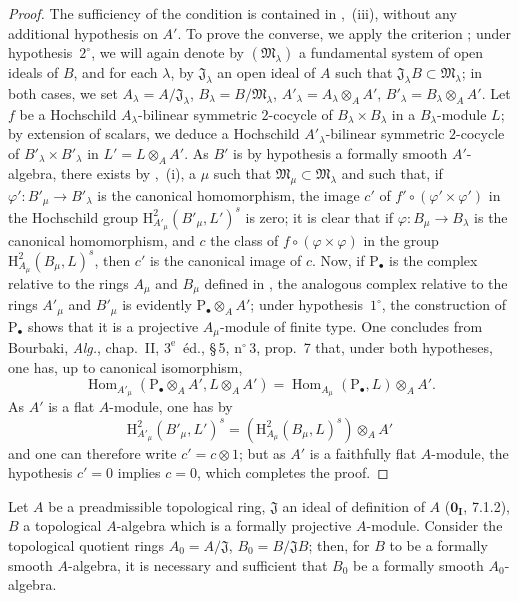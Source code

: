 \begin{proof}
The sufficiency of the condition is contained in ,~(iii), without any additional hypothesis on $A'$.
To prove the converse, we apply the criterion ;
under hypothesis~$2^\circ$, we will again denote by $(\mathfrak{M}_\lambda)$ a fundamental system of open ideals of $B$, and for each $\lambda$, by $\mathfrak{J}_\lambda$ an open ideal of $A$ such that $\mathfrak{J}_\lambda B\subset\mathfrak{M}_\lambda$;
in both cases, we set $A_\lambda=A/\mathfrak{J}_\lambda$, $B_\lambda=B/\mathfrak{M}_\lambda$, $A'_\lambda=A_\lambda\otimes_A A'$, $B'_\lambda=B_\lambda\otimes_A A'$.
Let $f$ be a Hochschild $A_\lambda$-bilinear symmetric $2$-cocycle of $B_\lambda\times B_\lambda$ in a $B_\lambda$-module $L$;
by extension of scalars, we deduce a Hochschild $A'_\lambda$-bilinear symmetric $2$-cocycle of $B'_\lambda\times B'_\lambda$ in $L'=L\otimes_A A'$.
As $B'$ is by hypothesis a formally smooth $A'$-algebra, there exists by ,~(i), a $\mu$ such that $\mathfrak{M}_\mu\subset\mathfrak{M}_\lambda$ and such that, if $\varphi':B'_\mu\to B'_\lambda$ is the canonical homomorphism, the image $c'$ of $f'\circ(\varphi'\times\varphi')$ in the Hochschild group $\mathrm{H}^2_{A'_\mu}(B'_\mu,L')^s$ is zero;
it is clear that if $\varphi:B_\mu\to B_\lambda$ is the canonical homomorphism, and $c$ the class of $f\circ(\varphi\times\varphi)$ in the group $\mathrm{H}^2_{A_\mu}(B_\mu,L)^s$, then $c'$ is the canonical image of $c$.
Now, if $\mathrm{P}_\bullet$ is the complex relative to the rings $A_\mu$ and $B_\mu$ defined in , the analogous complex relative to the rings $A'_\mu$ and $B'_\mu$ is evidently $\mathrm{P}_\bullet\otimes_A A'$;
under hypothesis~$1^\circ$, the construction of $\mathrm{P}_\bullet$ shows that it is a projective $A_\mu$-module of finite type.
One concludes from Bourbaki, \emph{Alg.}, chap.~II, $3^{\text{e}}$~\'{e}d., \S\,5, n$^\circ$\,3, prop.~7 that, under both hypotheses, one has, up to canonical isomorphism,
\[
  \operatorname{Hom}_{A'_\mu}(\mathrm{P}_\bullet\otimes_A A',L\otimes_A A')
  =\operatorname{Hom}_{A_\mu}(\mathrm{P}_\bullet,L)\otimes_A A'.
\]
As $A'$ is a flat $A$-module, one has by 
\[
  \mathrm{H}^2_{A'_\mu}(B'_\mu,L')^s = (\mathrm{H}^2_{A_\mu}(B_\mu,L)^s)\otimes_A A'
\]
and one can therefore write $c'=c\otimes 1$;
but as $A'$ is a faithfully flat $A$-module, the hypothesis $c'=0$ implies $c=0$, which completes the proof.
\end{proof}

\begin{proposition}[19.4.7]
\label{0.19.4.7}
Let $A$ be a preadmissible topological ring, $\mathfrak{J}$ an ideal of definition of $A$ ($\mathbf{0_I}$, 7.1.2), $B$ a topological $A$-algebra which is a formally projective $A$-module.
Consider the topological quotient rings $A_0=A/\mathfrak{J}$, $B_0=B/\mathfrak{J}B$;
then, for $B$ to be a formally smooth $A$-algebra, it is necessary and sufficient that $B_0$ be a formally smooth $A_0$-algebra.
\end{proposition}

